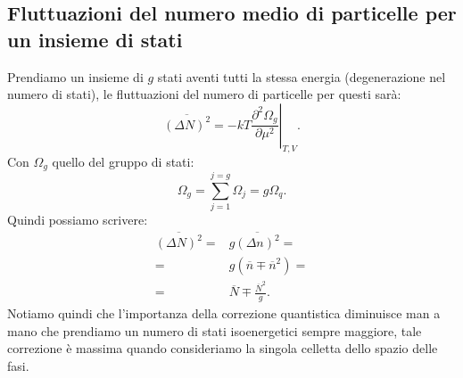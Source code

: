 \subsection{Fluttuazioni del numero medio di particelle per un insieme di stati}
\label{subsec:Fluttuazioni del numero medio di particelle per un insieme di stati}
Prendiamo un insieme di $g$ stati aventi tutti la stessa energia (degenerazione nel numero di stati), le fluttuazioni del numero di particelle per questi sarà:
\[
	\overline{\left(\Delta N\right)^2} 
	=
	-kT \left.\frac{\partial ^2 \Omega_g}{\partial \mu^2} \right|_{T,V}
.\] 
Con $\Omega_g$ quello del gruppo di stati:
\[
	\Omega _g = \sum_{j=1}^{j=g} \Omega_j = g \Omega _q 
.\] 
Quindi possiamo scrivere:
\[\begin{aligned}
	\overline{\left( \Delta N \right) ^2} 
	=&
	g \overline{\left( \Delta n \right)^2}=\\
	=&
	g \left( \overline{n} \mp \overline{n}^2 \right) =\\
	=&
	\overline{N} \mp \frac{\overline{N}^2}{g} \label{eq:fluttuazioni-g}
.\end{aligned}\]
Notiamo quindi che l'importanza della correzione quantistica diminuisce man a mano che prendiamo un numero di stati isoenergetici sempre maggiore, tale correzione è massima quando consideriamo la singola celletta dello spazio delle fasi.
